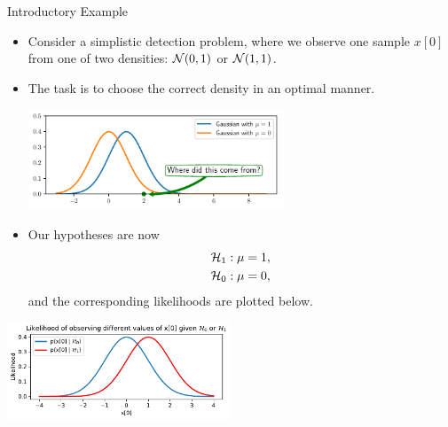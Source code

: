 \documentclass[10pt, aspectratio=169]{beamer} %
\begin{document}
\begin{frame}[allowframebreaks=0.8]
 {Introductory Example}
\begin{itemize}
\item Consider a simplistic detection
problem, where we observe one sample $x[0]$ from one of two
densities: ${\cal N}(0,1)$ or ${\cal N}(1,1)$. 
\item The task is to choose the correct density in an optimal manner.


\centerline{\includegraphics[width=0.6\textwidth]{two_gaussians.pdf}}
\eject

\item Our hypotheses are now
\begin{align*}
{\cal H}_1 &: \mu = 1,\\
{\cal H}_0 &: \mu = 0,
\end{align*}
and the corresponding likelihoods are plotted below.

\end{itemize}
\centerline{\includegraphics[width=0.5\textwidth]{NeymanPearson.pdf}}

\begin{itemize}


\end{itemize}
\end{frame}
\end{document}
